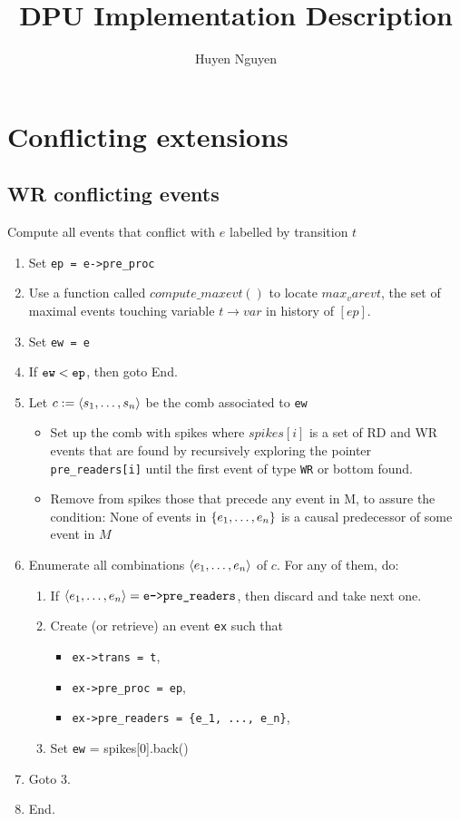 \documentclass{llncs}
\title{DPU Implementation Description}
\author{Huyen Nguyen}
\institute{Université Paris 13, Sorbonne Paris Cité, LIPN, CNRS, France}
\begin{document}
\maketitle
\noindent
\section{Conflicting extensions}
\subsection{WR conflicting events}
Compute all events that conflict with $e$ labelled by transition $t$
\begin{enumerate}
\item Set \verb!ep = e->pre_proc!
\item
	Use a function called $compute\_maxevt()$ to locate $max_varevt$, the set of maximal events touching variable $t \rightarrow
	 var$ in
	history of $[ep]$. 
\item Set \verb!ew = e!
\item If $\verb!ew! < \verb!ep!$, then goto End.
\item Let $c \mathrel{:=} \langle s_1, \ldots, s_n\rangle$ be the comb associated to \verb!ew!
	\begin{itemize}
	\item
		Set up the comb with spikes where $spikes[i]$ is a set of RD and WR events that are found by recursively exploring the
		pointer \verb!pre_readers[i]! until the first event of type \verb!WR! or bottom found.
	\item
		Remove from spikes those that precede any event in M, to assure the condition: None of events in ${\{ e_1, \ldots, e_n \mathclose \}}	
		$ is a causal predecessor of some event in $M$
\end{itemize}
\item
  Enumerate all combinations $\langle e_1, \ldots, e_n\rangle$ of $c$.
  For any of them, do:
  \begin{enumerate}
  \item
    If $\tup{e_1, \ldots, e_n} = \verb!e->pre_readers!$, then discard and take
    next one.
  \item
    Create (or retrieve) an event \verb!ex! such that
    \begin{itemize}
    \item \verb!ex->trans = t!,
    \item \verb!ex->pre_proc = ep!,
    \item \verb!ex->pre_readers = {e_1, ..., e_n}!,
    \end{itemize}
  \item
    Set \verb!ew! = spikes[0].back() 
  \end{enumerate}
\item Goto 3.
\item End.
\end{enumerate}
\end{document}
